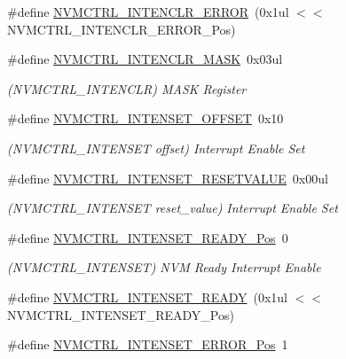 \begin{DoxyCompactItemize}
\#define \mbox{\hyperlink{group___s_a_m_d21___n_v_m_c_t_r_l_ga21e287f2b5ff9239dd9cca1068d6a5a5}{N\+V\+M\+C\+T\+R\+L\+\_\+\+I\+N\+T\+E\+N\+C\+L\+R\+\_\+\+E\+R\+R\+OR}}~(0x1ul $<$$<$ N\+V\+M\+C\+T\+R\+L\+\_\+\+I\+N\+T\+E\+N\+C\+L\+R\+\_\+\+E\+R\+R\+O\+R\+\_\+\+Pos)
\item 
\#define \mbox{\hyperlink{group___s_a_m_d21___n_v_m_c_t_r_l_ga399cac515ae8b6bfd864314732defbe9}{N\+V\+M\+C\+T\+R\+L\+\_\+\+I\+N\+T\+E\+N\+C\+L\+R\+\_\+\+M\+A\+SK}}~0x03ul
\begin{DoxyCompactList}\small\item\em (N\+V\+M\+C\+T\+R\+L\+\_\+\+I\+N\+T\+E\+N\+C\+LR) M\+A\+SK Register \end{DoxyCompactList}\item 
\#define \mbox{\hyperlink{group___s_a_m_d21___n_v_m_c_t_r_l_gacbc15881a076ca6d111540304e571a20}{N\+V\+M\+C\+T\+R\+L\+\_\+\+I\+N\+T\+E\+N\+S\+E\+T\+\_\+\+O\+F\+F\+S\+ET}}~0x10
\begin{DoxyCompactList}\small\item\em (N\+V\+M\+C\+T\+R\+L\+\_\+\+I\+N\+T\+E\+N\+S\+ET offset) Interrupt Enable Set \end{DoxyCompactList}\item 
\#define \mbox{\hyperlink{group___s_a_m_d21___n_v_m_c_t_r_l_gad48eea420ef04c6f0c75a074991ad6d6}{N\+V\+M\+C\+T\+R\+L\+\_\+\+I\+N\+T\+E\+N\+S\+E\+T\+\_\+\+R\+E\+S\+E\+T\+V\+A\+L\+UE}}~0x00ul
\begin{DoxyCompactList}\small\item\em (N\+V\+M\+C\+T\+R\+L\+\_\+\+I\+N\+T\+E\+N\+S\+ET reset\+\_\+value) Interrupt Enable Set \end{DoxyCompactList}\item 
\#define \mbox{\hyperlink{group___s_a_m_d21___n_v_m_c_t_r_l_ga4eca7adfbfcaa40c9a3904c9c141058a}{N\+V\+M\+C\+T\+R\+L\+\_\+\+I\+N\+T\+E\+N\+S\+E\+T\+\_\+\+R\+E\+A\+D\+Y\+\_\+\+Pos}}~0
\begin{DoxyCompactList}\small\item\em (N\+V\+M\+C\+T\+R\+L\+\_\+\+I\+N\+T\+E\+N\+S\+ET) N\+VM Ready Interrupt Enable \end{DoxyCompactList}\item 
\#define \mbox{\hyperlink{group___s_a_m_d21___n_v_m_c_t_r_l_gaec9faf993409c2da8bc71efd88933666}{N\+V\+M\+C\+T\+R\+L\+\_\+\+I\+N\+T\+E\+N\+S\+E\+T\+\_\+\+R\+E\+A\+DY}}~(0x1ul $<$$<$ N\+V\+M\+C\+T\+R\+L\+\_\+\+I\+N\+T\+E\+N\+S\+E\+T\+\_\+\+R\+E\+A\+D\+Y\+\_\+\+Pos)
\item 
\#define \mbox{\hyperlink{group___s_a_m_d21___n_v_m_c_t_r_l_gaac02b4043d398b4dc876e542fda447e0}{N\+V\+M\+C\+T\+R\+L\+\_\+\+I\+N\+T\+E\+N\+S\+E\+T\+\_\+\+E\+R\+R\+O\+R\+\_\+\+Pos}}~1

\end{DoxyCompactItemize}

